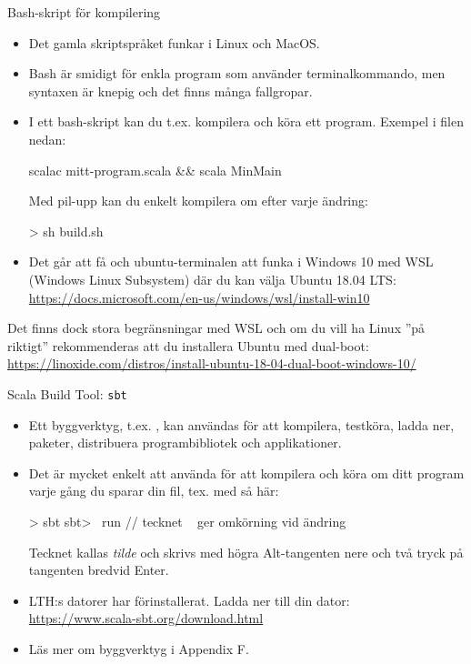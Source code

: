 \begin{Slide}{Bash-skript för kompilering}\SlideFontSmall
\begin{itemize}
  \item Det gamla skriptspråket  funkar i Linux och MacOS.
  \item Bash är smidigt för enkla program som använder terminalkommando, men syntaxen är knepig och det finns många fallgropar.
  \item I ett bash-skript kan du t.ex. kompilera och köra ett program. Exempel i filen  nedan:
\begin{Code}
scalac mitt-program.scala && scala MinMain
\end{Code}
Med pil-upp kan du enkelt kompilera om efter varje ändring:
\begin{REPLnonum}
> sh build.sh
\end{REPLnonum}
  \item Det går att få  och ubuntu-terminalen att funka i Windows 10 med WSL (Windows Linux Subsystem) där du kan välja Ubuntu 18.04 LTS: \\
  {\SlideFontTiny\url{https://docs.microsoft.com/en-us/windows/wsl/install-win10}}
\end{itemize}
{\noindent   Det finns dock stora begränsningar med WSL och om du vill ha Linux ''på riktigt'' rekommenderas att du installera Ubuntu med dual-boot: \SlideFontTiny\url{https://linoxide.com/distros/install-ubuntu-18-04-dual-boot-windows-10/}}
\end{Slide}

\begin{Slide}{Scala Build Tool: \texttt{sbt}}
\begin{itemize}
  \item Ett byggverktyg, t.ex. , kan användas för att kompilera, testköra, ladda ner, paketer, distribuera programbibliotek och applikationer.
  \item Det är mycket enkelt att använda  för att kompilera och köra om ditt program varje gång du sparar din fil, tex. med  så här:
\begin{REPLnonum}
> sbt
sbt> ~run   // tecknet ~ ger omkörning vid ändring
\end{REPLnonum}
Tecknet \code{~} kallas \emph{tilde} och skrivs med högra Alt-tangenten nere och två tryck på tangenten bredvid Enter.
  \item LTH:s datorer har  förinstallerat. Ladda ner till din dator: \\
  \url{https://www.scala-sbt.org/download.html}
  \item Läs mer om byggverktyg i Appendix F.

\end{itemize}

\end{Slide}




